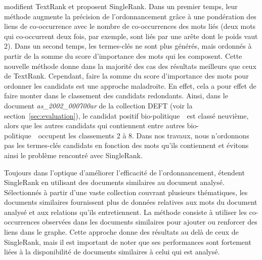      modifient TextRank et proposent SingleRank. Dans
    un premier temps, leur méthode augmente la précision de l'ordonnancement
    grâce à une pondération des liens de co-occurrence avec le nombre de
    co-occurrences des mots liés (deux mots qui co-occurrent deux fois, par
    exemple, sont liés par une arête dont le poids vaut 2).
    Dans un second temps, les termes-clés ne sont plus générés, mais ordonnés à
    partir de la somme du score d'importance des mots qui les composent. Cette
    nouvelle méthode donne dans la majorité des cas des résultats meilleurs que
    ceux de TextRank. Cependant, faire la somme du score d'importance des
    mots pour ordonner les candidats est une approche maladroite. En effet, cela
    a pour effet de faire monter dans le classement des candidats redondants.
    Ainsi, dans le document \textit{as\_2002\_000700ar} de la collection DEFT
    (voir la section~\ref{sec:evaluation}), le candidat positif
    \og bio-politique~\fg\ est classé neuvième, alors que les autres candidats
    qui contiennent entre autres \og bio-politique~\fg\ occupent les
    classements 2 à 8. Dans nos travaux, nous n'ordonnons pas les termes-clés
    candidats en fonction des mots qu'ils contiennent et évitons ainsi le
    problème rencontré avec SingleRank.

    Toujours dans l'optique d'améliorer l'efficacité de l'ordonnancement,
     étendent SingleRank en utilisant des documents
    similaires au document analysé. Sélectionnés à partir d'une vaste collection
    couvrant plusieurs thématiques, les documents similaires fournissent plus de
    données relatives aux mots du document analysé et aux relations qu'ils
    entretiennent. La méthode consiste à utiliser les co-occurrences observées
    dans les documents similaires pour ajouter ou renforcer des liens dans le
    graphe. Cette approche donne des résultats au delà de ceux de SingleRank,
    mais il est important de noter que ses performances sont fortement liées à
    la disponibilité de documents similaires à celui qui est analysé.

